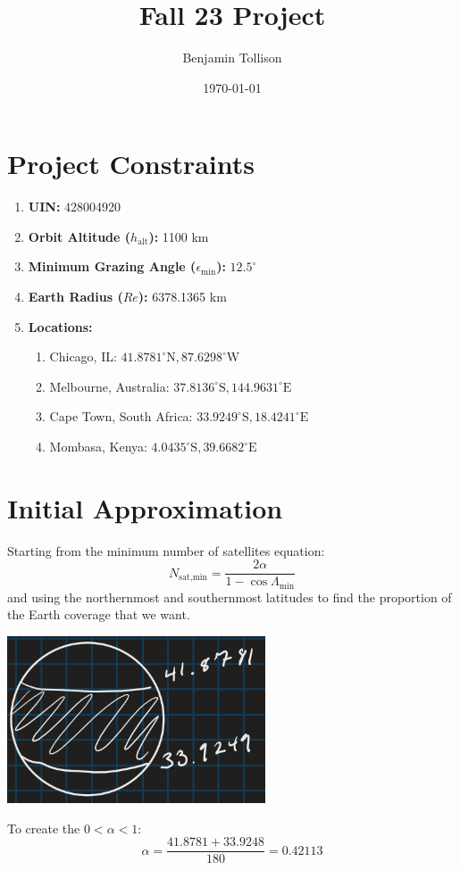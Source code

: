 \documentclass[a4paper, twoside]{article}
\date{\monthyeardate\today}
\author{Benjamin Tollison}
\title{Fall 23 Project}
\begin{document}

% 
\tableofcontents
\newpage
\section{Project Constraints}
\begin{enumerate}
   \item \textbf{UIN:} 428004920
   \item \textbf{Orbit Altitude (\(h_{\text{alt}}\)):} 1100 km
   \item \textbf{Minimum Grazing Angle (\(\epsilon_{\min}\)):} \(12.5^{\circ}\)
   \item \textbf{Earth Radius (\(Re\)):} 6378.1365 km
   \item \textbf{Locations:}
   \begin{enumerate}
      \item Chicago, IL: \(41.8781^\circ \text{N}, 87.6298^\circ \text{W}\)
      \item Melbourne, Australia: \(37.8136^\circ \text{S}, 144.9631^\circ \text{E}\)
      \item Cape Town, South Africa: \(33.9249^\circ \text{S}, 18.4241^\circ \text{E}\)
      \item Mombasa, Kenya: \(4.0435^\circ \text{S}, 39.6682^\circ \text{E}\)
   \end{enumerate}
\end{enumerate}

\section{Initial Approximation}
Starting from the minimum number of satellites equation:
\[N_{\text{sat,min}} = \frac{2\alpha}{1-\cos{\Lambda_{\min}}}\]
and using the northernmost and southernmost latitudes to find the proportion of the Earth coverage that we want.
\begin{center}
\includegraphics{alpha-coverage.png}    
\end{center}
To create the \(0<\alpha<1\):
\[\alpha = \frac{41.8781 + 33.9248}{180} = 0.42113\]
\end{document}
